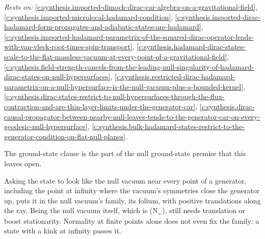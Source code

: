 \documentclass[11pt]{article}
\theoremstyle{definition}
\theoremstyle{plain}
\begin{document}
\noindent\emph{Rests on:} \ref{c:synthesis.imported-dimock-dirac-car-algebra-on-a-gravitational-field}, \ref{c:synthesis.imported-microlocal-hadamard-condition}, \ref{c:synthesis.imported-dirac-hadamard-form-propagates-and-adiabatic-states-are-hadamard}, \ref{c:synthesis.imported-hadamard-parametrix-of-the-squared-dirac-operator-leads-with-van-vleck-root-times-spin-transport}, \ref{c:synthesis.hadamard-dirac-states-scale-to-the-flat-massless-vacuum-at-every-point-of-a-gravitational-field}, \ref{c:synthesis.field-strength-cancels-from-the-leading-null-singularity-of-hadamard-dirac-states-on-null-hypersurfaces}, \ref{c:synthesis.restricted-dirac-hadamard-parametrix-on-a-null-hypersurface-is-the-null-vacuum-plus-a-bounded-kernel}, \ref{c:synthesis.dirac-states-restrict-to-null-hypersurfaces-through-the-flux-contraction-and-are-thin-layer-limits-under-the-generator-car}, \ref{c:synthesis.dirac-causal-propagator-between-nearby-null-leaves-tends-to-the-generator-car-on-every-geodesic-null-hypersurface}, \ref{c:synthesis.bulk-hadamard-states-restrict-to-the-generator-condition-on-flat-null-planes}.

The ground-state clause is the part of the null ground-state premise that this leaves open.

Asking the state to look like the null vacuum near every point of a generator, including the point at infinity where the vacuum's symmetries close the generator up, puts it in the null vacuum's family, its folium, with positive translations along the ray. Being the null vacuum itself, which is (N$_{+}$), still needs translation or boost stationarity. Normality at finite points alone does not even fix the family: a state with a kink at infinity passes it.
\end{document}
